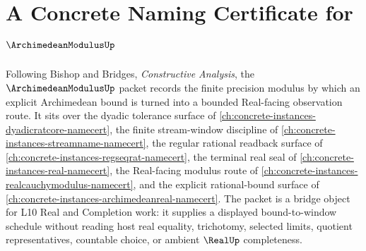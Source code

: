 \chapter{A Concrete Naming Certificate for $\ArchimedeanModulusUp$}
\label{ch:concrete-instances-archimedeanmodulus-namecert}

Following Bishop and Bridges, \emph{Constructive Analysis}, the $\ArchimedeanModulusUp$ packet records the finite precision modulus by which an explicit Archimedean bound is turned into a bounded Real-facing observation route. It sits over the dyadic tolerance surface of \autoref{ch:concrete-instances-dyadicratcore-namecert}, the finite stream-window discipline of \autoref{ch:concrete-instances-streamname-namecert}, the regular rational readback surface of \autoref{ch:concrete-instances-regseqrat-namecert}, the terminal real seal of \autoref{ch:concrete-instances-real-namecert}, the Real-facing modulus route of \autoref{ch:concrete-instances-realcauchymodulus-namecert}, and the explicit rational-bound surface of \autoref{ch:concrete-instances-archimedeanreal-namecert}. The packet is a bridge object for L10 Real and Completion work: it supplies a displayed bound-to-window schedule without reading host real equality, trichotomy, selected limits, quotient representatives, countable choice, or ambient $\RealUp$ completeness.

